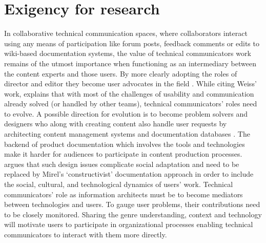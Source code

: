 \section{Exigency for research}
In collaborative technical communication spaces, where collaborators interact using any means of participation like forum posts, feedback comments or edits to wiki-based documentation systems, the value of technical communicators work remains of the utmost importance when functioning as an intermediary between the content experts and those users. By more clearly adopting the roles of director and editor they become user advocates in the field \cite{redish2010technical}. While citing Weiss’ work, \textcite{albers2004communication} explains that with most of the challenges of usability and communication already solved (or handled by other teams), technical communicators’ roles need to evolve. A possible direction for evolution is to become problem solvers and designers who along with creating content also handle user requests by architecting content management systems and documentation databases \cite{albers2004communication}. The backend of product documentation which involves the tools and technologies make it harder for audiences to participate in content production processes. \textcite{swarts2018wicked} argues that such design issues complicate social adaptation and need to be replaced by Mirel’s ‘constructivist’ documentation approach in order to include the social, cultural, and technological dynamics of users’ work. Technical communicators' role as information architects must be to become mediators between technologies and users. To gauge user problems, their contributions need to be closely monitored. Sharing the genre understanding, context and technology will motivate users to participate in organizational processes enabling technical communicators to interact with them more directly.

